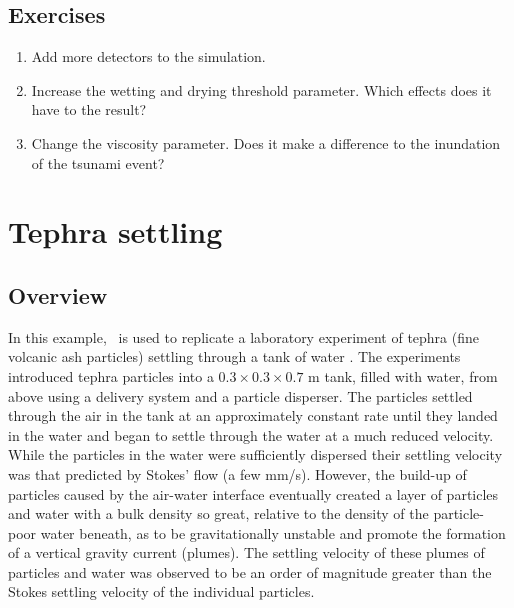 \subsection{Exercises}
\begin{enumerate}
\item Add more detectors to the simulation.
\item Increase the wetting and drying threshold parameter. Which effects does it have to the result?
\item Change the viscosity parameter. Does it make a difference to the inundation of the tsunami event?
\end{enumerate}



\section{Tephra settling}
\label{sec:tephra_settling}

\subsection{Overview}
In this example, \fluidity\ is used to replicate a laboratory experiment of tephra (fine volcanic ash particles) settling through a tank of water \citep{carey1997}. The \cite{carey1997} experiments introduced tephra particles into a $0.3\times 0.3\times 0.7$ m tank, filled with water, from above using a delivery system and a particle disperser. The particles settled through the air in the tank at an approximately constant rate until they landed in the water and began to settle through the water at a much reduced velocity. While the particles in the water were sufficiently dispersed their settling velocity was that predicted by Stokes' flow (a few mm/s).  However, the build-up of particles caused by the air-water interface eventually created a layer of particles and water with a bulk density so great, relative to the density of the particle-poor water beneath, as to be gravitationally unstable and promote the formation of a vertical gravity current (plumes). The settling velocity of these plumes of particles and water was observed to be an order of magnitude greater than the Stokes settling velocity of the individual particles.

